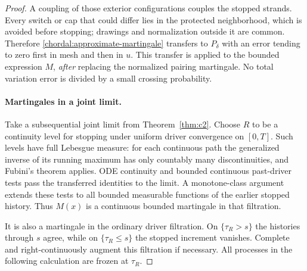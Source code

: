 \begin{proof}
A coupling of those exterior configurations couples the stopped
strands.  Every switch or cap that could differ lies in the
protected neighborhood, which is avoided before stopping; drawings
and normalization outside it are common.  Therefore
\eqref{chordal:approximate-martingale} transfers to $P_\delta$
with an error tending to zero first in mesh and then in $u$.
This transfer is applied to the bounded expression $M$, \emph{after}
replacing the normalized pairing martingale.  No total variation
error is divided by a small crossing probability.

\paragraph{Martingales in a joint limit.}
Take a subsequential joint limit from Theorem~\ref{thm:c2}.
Choose $R$ to be a continuity level for stopping under uniform
driver convergence on $[0,T]$.  Such levels have full Lebesgue
measure: for each continuous path the generalized inverse of its
running maximum has only countably many discontinuities, and
Fubini's theorem applies.  ODE continuity and bounded continuous
past-driver tests pass the transferred identities to the limit.
A monotone-class argument extends these tests to all bounded
measurable functions of the earlier stopped history.  Thus $M(x)$
is a continuous bounded martingale in that filtration.

It is also a martingale in the ordinary driver filtration.  On
$\{\tau_R>s\}$ the histories through $s$ agree, while on
$\{\tau_R\le s\}$ the stopped increment vanishes.  Complete and
right-continuously augment this filtration if necessary.
All processes in the following calculation are frozen at $\tau_R$.


\end{proof}
